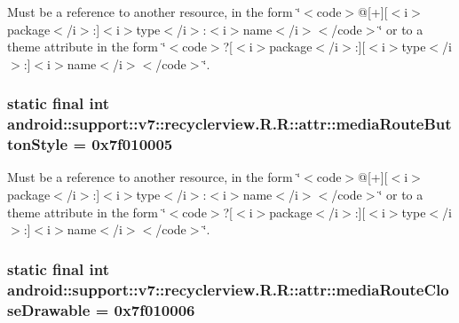 Must be a reference to another resource, in the form \char`\"{}$<$code$>$@\mbox{[}+\mbox{]}\mbox{[}$<$i$>$package$<$/i$>$:\mbox{]}$<$i$>$type$<$/i$>$:$<$i$>$name$<$/i$>$$<$/code$>$\char`\"{} or to a theme attribute in the form \char`\"{}$<$code$>$?\mbox{[}$<$i$>$package$<$/i$>$:\mbox{]}\mbox{[}$<$i$>$type$<$/i$>$:\mbox{]}$<$i$>$name$<$/i$>$$<$/code$>$\char`\"{}. \hypertarget{classandroid_1_1support_1_1v7_1_1recyclerview_1_1_r_1_1attr_df3f35775a96f8daa76217bba2490da4}{
\subsubsection[{mediaRouteButtonStyle}]{\setlength{\rightskip}{0pt plus 5cm}static final int android::support::v7::recyclerview.R.R::attr::mediaRouteButtonStyle = 0x7f010005}}
\label{classandroid_1_1support_1_1v7_1_1recyclerview_1_1_r_1_1attr_df3f35775a96f8daa76217bba2490da4}


Must be a reference to another resource, in the form \char`\"{}$<$code$>$@\mbox{[}+\mbox{]}\mbox{[}$<$i$>$package$<$/i$>$:\mbox{]}$<$i$>$type$<$/i$>$:$<$i$>$name$<$/i$>$$<$/code$>$\char`\"{} or to a theme attribute in the form \char`\"{}$<$code$>$?\mbox{[}$<$i$>$package$<$/i$>$:\mbox{]}\mbox{[}$<$i$>$type$<$/i$>$:\mbox{]}$<$i$>$name$<$/i$>$$<$/code$>$\char`\"{}. \hypertarget{classandroid_1_1support_1_1v7_1_1recyclerview_1_1_r_1_1attr_14c94a85d9cf0fae57d8997fb109fd8c}{
\subsubsection[{mediaRouteCloseDrawable}]{\setlength{\rightskip}{0pt plus 5cm}static final int android::support::v7::recyclerview.R.R::attr::mediaRouteCloseDrawable = 0x7f010006}}
\label{classandroid_1_1support_1_1v7_1_1recyclerview_1_1_r_1_1attr_14c94a85d9cf0fae57d8997fb109fd8c}


